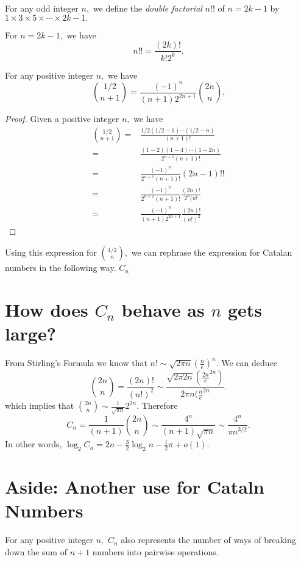 
\begin{definition}
	For any odd integer $n,$ we define the \emph{double factorial}
	$n!!$ of $n=2k-1$ by $1 \times 3 \times  5 \times \cdots 
	\times 2k-1.$
\end{definition}
For $n = 2k-1,$ we have
$$ n!! = \frac{(2k)!}{k! 2^k}.$$


\begin{lemma}
	For any positive integer $n,$ we have
	$$ \binom{1/2}{n+1} = 
	\frac{(-1)^n}{ (n+1) 2^{2n+1}} \binom{2n}{n}.$$
\end{lemma}

\begin{proof}
	Given a positive integer $n,$ we have
	\begin{align*}
		\binom{1/2}{n+1}
		={}& \frac{1/2 (1/2-1)\cdots(1/2-n)}{(n+1)!}\\
		={}& \frac{(1-2)(1-4)\cdots(1-2n)}{2^{n+1} (n+1)!} \\
		={}& \frac{(-1)^n}{2^{n+1} (n+1)!} (2n-1)!!\\
		={}& \frac{(-1)^n}{2^{n+1} (n+1)!} \frac{(2n)!}{2^n (n!}\\
		={}& \frac{(-1)^n}{(n+1) 2^{2n+1}} \frac{(2n)!}{(n!)^2}
	\end{align*}
	
\end{proof}


Using this expression for $\binom{1/2}{n},$ we can rephrase the 
expression for Catalan numbers in the following way.
$C_n$

\section{How does $C_n$ behave as $n$ gets large?}
From Stirling's Formula we know that
$n! \sim \sqrt{2 \pi n} \left( \frac{n}{e} \right) ^n.$ We can deduce
$$ \binom{2n }{n} = 
\frac{(2n)!}{(n!)^2} \sim
\frac{\sqrt{2\pi 2n} \left( \frac{2n}{e}^{2n} \right) }{ 2\pi n (
\frac{n}{e}^{2n}}.$$
which implies that
$\binom{2n}{n} \sim \frac{1}{\sqrt{\pi n}} 2^{2n}.$
Therefore
$$ C_n = \frac{1}{(n+1)} \binom{2n}{n}
\sim \frac{4^n}{(n+1) \sqrt{\pi n}}
\sim \frac{4^n}{ \pi n^{3/2}}.$$
In other words,
$\log_2 C_n = 2n - \frac{3}{2} \log_2 n - \frac{1}{2} \pi + o(1).$

\section{Aside: Another use for Cataln Numbers}
For any positive integer $n,$ $C_n$ also represents the number of ways
of breaking down the sum of $n+1$ numbers into pairwise operations.

